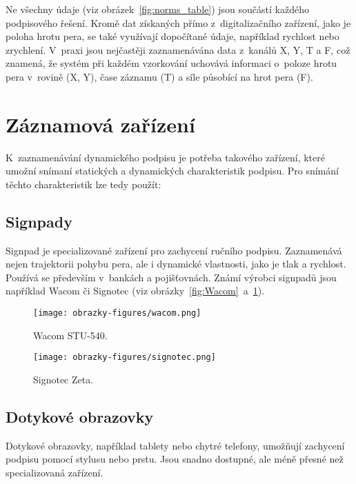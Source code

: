 Ne všechny údaje (viz obrázek~\ref{fig:norms_table}) jsou součástí každého podpisového řešení. 
Kromě dat získaných přímo z~digitalizačního zařízení, jako je poloha hrotu pera, se také využívají dopočítané údaje, například rychlost nebo zrychlení. 
V~praxi jsou nejčastěji zaznamenávána data z~kanálů X, Y, T a F, což znamená, že systém při každém vzorkování uchovává informaci o~poloze hrotu pera v~rovině (X, Y), čase záznamu (T) a síle působící na hrot pera (F).~\cite{DSM2021b}

\section{Záznamová zařízení}
K~zaznamenávání dynamického podpisu je potřeba takového zařízení, které umožní snímaní statických a dynamických charakteristik podpisu.
Pro snímání těchto charakteristik lze tedy použít:

\subsection*{Signpady}
Signpad je specializované zařízení pro zachycení ručního podpisu. 
Zaznamenává nejen trajektorii pohybu pera, ale i dynamické vlastnosti, jako je tlak a rychlost. 
Používá se především v~bankách a pojišťovnách.
Známí výrobci signpadů jsou například Wacom či Signotec (viz obrázky~\ref{fig:Wacom}~a~\ref{fig:Signotec}).

\begin{figure}[H]
  \centering
  \begin{minipage}{0.45\textwidth}
      \centering
      \texttt{[image: obrazky-figures/wacom.png]}
      \caption{Wacom STU-540.~\cite{Wacom_STU_540}}
      \label{fig:Wacom}
  \end{minipage}
  \begin{minipage}{0.45\textwidth}
      \centering
      \texttt{[image: obrazky-figures/signotec.png]}
      \caption{Signotec Zeta.~\cite{Signotec_Zeta}}
      \label{fig:Signotec}
  \end{minipage}
\end{figure}


\subsection*{Dotykové obrazovky}
Dotykové obrazovky, například tablety nebo chytré telefony, umožňují zachycení podpisu pomocí stylusu nebo prstu. 
Jsou snadno dostupné, ale méně přesné než specializovaná zařízení.

